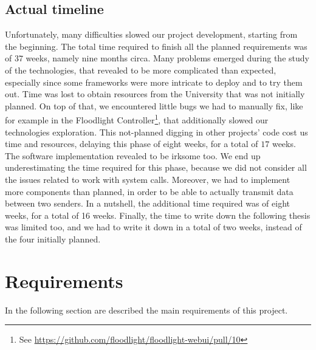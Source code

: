 \subsection{Actual timeline}
Unfortunately, many difficulties slowed our project development, starting from
the beginning. The total time required to finish all the planned requirements
was of $37$ weeks, namely nine months circa. Many problems emerged during the
study of the technologies, that revealed to be more complicated than expected,
especially since some frameworks were more intricate to deploy and to try them
out. Time was lost to obtain resources from the University that was not
initially planned. On top of that, we encountered little bugs we had to manually
fix, like for example in the Floodlight
Controller\footnote{See \url{https://github.com/floodlight/floodlight-webui/pull/10}},
that additionally slowed our technologies exploration. This not-planned digging
in other projects' code cost us time and resources, delaying this phase of eight
weeks, for a total of $17$ weeks. The software implementation revealed to be
irksome too. We end up underestimating the time required for this phase, because
we did not consider all the issues related to work with system calls. Moreover,
we had to implement more components than planned, in order to be able to
actually transmit data between two senders. In a nutshell, the additional time
required was of eight weeks, for a total of 16 weeks. Finally, the time to write
down the following thesis was limited too, and we had to write it down in a
total of two weeks, instead of the four initially planned.

\section{Requirements}\label{chap:prjan:sec:req}
In the following section are described the main requirements of this project.

